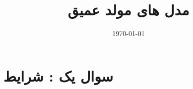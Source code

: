 \documentclass[12pt]{article}
\title{مدل های مولد عمیق}
\date{\today}
\begin{document}
\maketitlepage
\maketitlestart


\tableofcontents
\newpage
\section{سوال یک :  شرایط}











\clearpage



\end{document}
